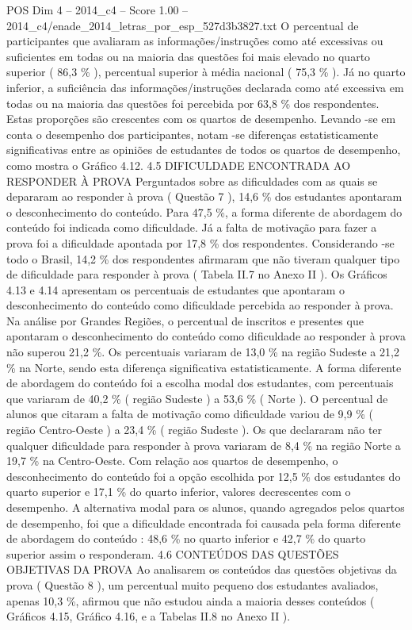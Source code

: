 \begin{textsample}{POS Dim 4 – 2014\_c4 – Score 1.00 – 2014\_c4/enade\_2014\_letras\_por\_esp\_527d3b3827.txt}
O percentual de participantes que avaliaram as informações/instruções como até excessivas ou suficientes em todas ou na maioria das questões foi mais elevado no quarto superior ( 86,3 \% ), percentual superior à média nacional ( 75,3 \% ).
Já no quarto inferior, a suficiência das informações/instruções declarada como até excessiva em todas ou na maioria das questões foi percebida por 63,8 \% dos respondentes.
Estas proporções são crescentes com os quartos de desempenho.
Levando -se em conta o desempenho dos participantes, notam -se diferenças estatisticamente significativas entre as opiniões de estudantes de todos os quartos de desempenho, como mostra o Gráfico 4.12. 4.5 DIFICULDADE ENCONTRADA AO RESPONDER À PROVA Perguntados sobre as dificuldades com as quais se depararam ao responder à prova ( Questão 7 ), 14,6 \% dos estudantes apontaram o desconhecimento do conteúdo.
Para 47,5 \%, a forma diferente de abordagem do conteúdo foi indicada como dificuldade.
Já a falta de motivação para fazer a prova foi a dificuldade apontada por 17,8 \% dos respondentes.
Considerando -se todo o Brasil, 14,2 \% dos respondentes afirmaram que não tiveram qualquer tipo de dificuldade para responder à prova ( Tabela II.7 no Anexo II ).
Os Gráficos 4.13 e 4.14 apresentam os percentuais de estudantes que apontaram o desconhecimento do conteúdo como dificuldade percebida ao responder à prova.
Na análise por Grandes Regiões, o percentual de inscritos e presentes que apontaram o desconhecimento do conteúdo como dificuldade ao responder à prova não superou 21,2 \%.
Os percentuais variaram de 13,0 \% na região Sudeste a 21,2 \% na Norte, sendo esta diferença significativa estatisticamente.
A forma diferente de abordagem do conteúdo foi a escolha modal dos estudantes, com percentuais que variaram de 40,2 \% ( região Sudeste ) a 53,6 \% ( Norte ).
O percentual de alunos que citaram a falta de motivação como dificuldade variou de 9,9 \% ( região Centro-Oeste ) a 23,4 \% ( região Sudeste ).
Os que declararam não ter qualquer dificuldade para responder à prova variaram de 8,4 \% na região Norte a 19,7 \% na Centro-Oeste.
Com relação aos quartos de desempenho, o desconhecimento do conteúdo foi a opção escolhida por 12,5 \% dos estudantes do quarto superior e 17,1 \% do quarto inferior, valores decrescentes com o desempenho.
A alternativa modal para os alunos, quando agregados pelos quartos de desempenho, foi que a dificuldade encontrada foi causada pela forma diferente de abordagem do conteúdo : 48,6 \% no quarto inferior e 42,7 \% do quarto superior assim o responderam. 4.6 CONTEÚDOS DAS QUESTÕES OBJETIVAS DA PROVA Ao analisarem os conteúdos das questões objetivas da prova ( Questão 8 ), um percentual muito pequeno dos estudantes avaliados, apenas 10,3 \%, afirmou que não estudou ainda a maioria desses conteúdos ( Gráficos 4.15, Gráfico 4.16, e a Tabelas II.8 no Anexo II ).

\end{textsample}
